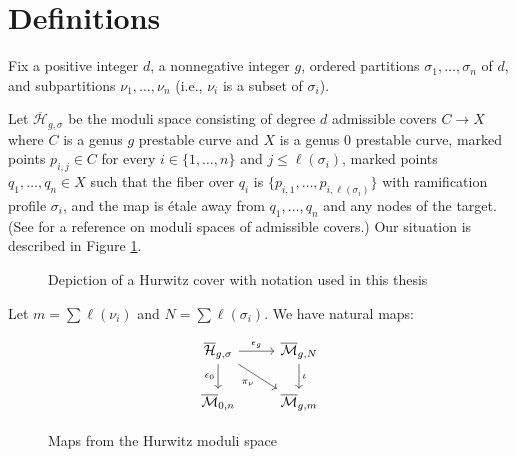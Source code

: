 \documentclass[thesis]{thesis-umich}           %
\newcommand{\Hb}{\overline{\mathcal H}}
\theoremstyle{definition}
\begin{document}
\section{Definitions}
Fix a positive integer $d$, a nonnegative integer $g$, ordered partitions $\sigma_1,\dots,\sigma_n$ of $d$, and subpartitions $\nu_1,\dots,\nu_n$ (i.e., $\nu_i$ is a subset of $\sigma_i$).

Let $\Hb_{g,\sigma}$ be the moduli space consisting of degree $d$ admissible covers $C\to X$ where $C$ is a genus $g$ prestable curve and $X$ is a genus $0$ prestable curve, marked points $p_{i,j}\in C$ for every $i\in\{1,\dots,n\}$ and
$j\leq \ell(\sigma_i)$, 
marked points $q_1,\dots,q_n\in X$ such that
the fiber over $q_i$ is $\{p_{i,1},\dots,p_{i,\ell(\sigma_i)}\}$ with
ramification profile $\sigma_i$, and the map is \'etale away from $q_1,\dots,q_n$ and any nodes of the target. (See \cite{Admissible} for a reference on moduli spaces of admissible covers.) Our situation is described in Figure \ref{fig:hurwitz}.

\begin{figure}[h]
  \caption{Depiction of a Hurwitz cover with notation used in this thesis}
  \centering
{}

\label{fig:hurwitz}
\end{figure}



Let $m=\sum\ell(\nu_i)$ and $N=\sum\ell(\sigma_i)$.
We have natural maps: %
~\\
\begin{figure}[h]
  \caption{Maps from the Hurwitz moduli space}
  \centering
  \[\begin{tikzcd}
	{\overline{\mathcal H}_{g,\sigma}} & {\overline{\mathcal M}_{g,N}} \\
	{\overline{\mathcal M}_{0,n}} & {\overline{\mathcal M}_{g,m}}
	\arrow["{\epsilon_g}", from=1-1, to=1-2]
	\arrow["{\epsilon_0}"', from=1-1, to=2-1]
	\arrow["{\pi_{\nu}}"', from=1-1, to=2-2]
	\arrow["\iota", from=1-2, to=2-2]
\end{tikzcd}\]
\label{fig:maps}
\end{figure}
\end{document}
